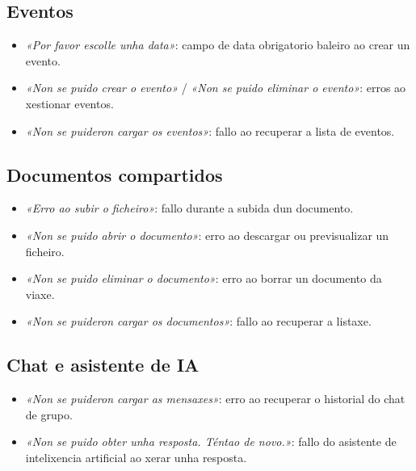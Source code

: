 \subsection*{Eventos}
\begin{itemize}
  \item \textit{«Por favor escolle unha data»}: campo de data obrigatorio baleiro ao crear
        un evento.
  \item \textit{«Non se puido crear o evento»} / \textit{«Non se puido eliminar o evento»}:
        erros ao xestionar eventos.
  \item \textit{«Non se puideron cargar os eventos»}: fallo ao recuperar a lista de eventos.
\end{itemize}

\subsection*{Documentos compartidos}
\begin{itemize}
  \item \textit{«Erro ao subir o ficheiro»}: fallo durante a subida dun documento.
  \item \textit{«Non se puido abrir o documento»}: erro ao descargar ou previsualizar un
        ficheiro.
  \item \textit{«Non se puido eliminar o documento»}: erro ao borrar un documento da viaxe.
  \item \textit{«Non se puideron cargar os documentos»}: fallo ao recuperar a listaxe.
\end{itemize}

\subsection*{Chat e asistente de IA}
\begin{itemize}
  \item \textit{«Non se puideron cargar as mensaxes»}: erro ao recuperar o historial do
        chat de grupo.
  \item \textit{«Non se puido obter unha resposta. Téntao de novo.»}: fallo do asistente
        de intelixencia artificial ao xerar unha resposta.
\end{itemize}

